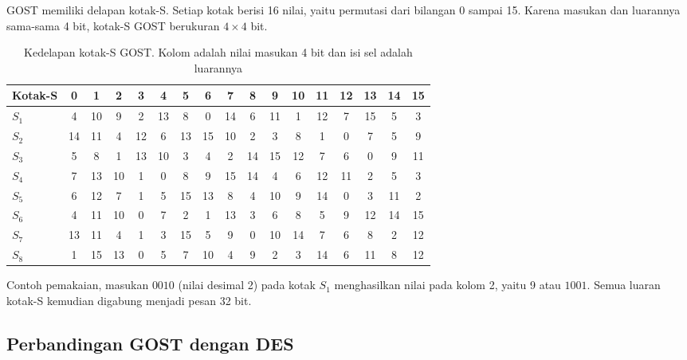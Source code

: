 GOST memiliki delapan kotak-S. Setiap kotak berisi 16 nilai, yaitu permutasi dari
bilangan 0 sampai 15. Karena masukan dan luarannya sama-sama 4 bit, kotak-S GOST
berukuran $4 \times 4$ bit.

\begin{table}[htbp]
    \centering
    \footnotesize
    \setlength{\tabcolsep}{4pt}
    \begin{tabular}{@{}l*{16}{c}@{}}
    \toprule
    \textbf{Kotak-S} & 0 & 1 & 2 & 3 & 4 & 5 & 6 & 7 & 8 & 9 & 10 & 11 & 12 & 13 & 14 & 15 \\
    \midrule
    $S_1$ &  4 & 10 &  9 &  2 & 13 &  8 &  0 & 14 &  6 & 11 &  1 & 12 &  7 & 15 &  5 &  3 \\
    $S_2$ & 14 & 11 &  4 & 12 &  6 & 13 & 15 & 10 &  2 &  3 &  8 &  1 &  0 &  7 &  5 &  9 \\
    $S_3$ &  5 &  8 &  1 & 13 & 10 &  3 &  4 &  2 & 14 & 15 & 12 &  7 &  6 &  0 &  9 & 11 \\
    $S_4$ &  7 & 13 & 10 &  1 &  0 &  8 &  9 & 15 & 14 &  4 &  6 & 12 & 11 &  2 &  5 &  3 \\
    $S_5$ &  6 & 12 &  7 &  1 &  5 & 15 & 13 &  8 &  4 & 10 &  9 & 14 &  0 &  3 & 11 &  2 \\
    $S_6$ &  4 & 11 & 10 &  0 &  7 &  2 &  1 & 13 &  3 &  6 &  8 &  5 &  9 & 12 & 14 & 15 \\
    $S_7$ & 13 & 11 &  4 &  1 &  3 & 15 &  5 &  9 &  0 & 10 & 14 &  7 &  6 &  8 &  2 & 12 \\
    $S_8$ &  1 & 15 & 13 &  0 &  5 &  7 & 10 &  4 &  9 &  2 &  3 & 14 &  6 & 11 &  8 & 12 \\
    \bottomrule
    \end{tabular}
    \caption{Kedelapan kotak-S GOST. Kolom adalah nilai masukan 4 bit dan isi sel
    adalah luarannya}
    \label{tab:kotak-s-gost}
\end{table}

Contoh pemakaian, masukan $0010$ (nilai desimal 2) pada kotak $S_1$ menghasilkan
nilai pada kolom 2, yaitu 9 atau $1001$. Semua luaran kotak-S kemudian digabung
menjadi pesan 32 bit.

\subsection{Perbandingan GOST dengan DES}

